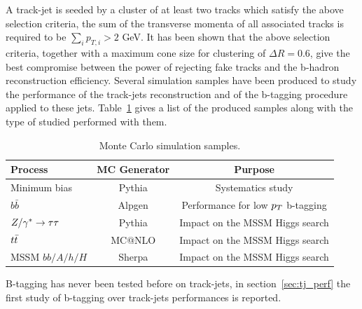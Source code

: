 A track-jet is seeded by a cluster of at least two tracks which satisfy the above selection criteria, 
the sum of the transverse momenta of all associated tracks is required to be $\sum_ip_{T,i} > 2$ GeV.
It has been shown that the above selection criteria, together with a maximum cone size for clustering of 
$\Delta R = 0.6$, give the best compromise between the power of rejecting  fake tracks and the b-hadron reconstruction efficiency.
Several simulation samples have been produced to study the performance of the track-jets reconstruction and of the b-tagging procedure
applied to these jets.
Table~\ref{tab:tackjetSample}  gives a list of the produced samples along with the type of studied performed with them.

\begin{table}[tp]
	\caption{Monte Carlo simulation samples.}  %
	\vspace{3mm}
\centering
	\begin{tabular}{l c c}
	\hline
	\hline
	Process		&	MC Generator 	& Purpose				\\
	\hline
	Minimum bias	& Pythia		& Systematics study 			\\
	$b\bar{b}$ 	& Alpgen		& Performance for low $p_{T}$ b-tagging 	\\
	$Z/\gamma^*\rightarrow \tau\tau$ 	& Pythia		& Impact on the MSSM Higgs search 	\\
	$t\bar{t}$	& MC@NLO		& Impact on the MSSM Higgs search\\
	MSSM $bb/A/h/H$ & Sherpa		& Impact on the MSSM Higgs search \\ 
	\hline
	\hline
	\end{tabular}
	\label{tab:tackjetSample}
\end{table}
	

B-tagging has never been tested before on track-jets, in section~\ref{sec:tj_perf} the first study of b-tagging over track-jets 
performances is reported. 


